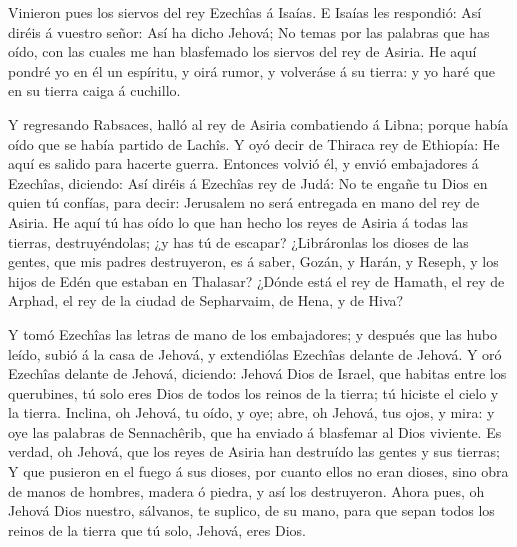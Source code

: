  Vinieron pues los siervos del rey Ezechîas á Isaías.
 E Isaías les respondió: Así diréis á vuestro señor: Así ha
dicho Jehová; No temas por las palabras que has oído, con las cuales me
han blasfemado los siervos del rey de Asiria.  He aquí
pondré yo en él un espíritu, y oirá rumor, y volveráse á su tierra: y yo
haré que en su tierra caiga á cuchillo.

 Y regresando Rabsaces, halló al rey de Asiria combatiendo á
Libna; porque había oído que se había partido de Lachîs.  Y
oyó decir de Thiraca rey de Ethiopía: He aquí es salido para hacerte
guerra. Entonces volvió él, y envió embajadores á Ezechîas, diciendo:
 Así diréis á Ezechîas rey de Judá: No te engañe tu Dios en
quien tú confías, para decir: Jerusalem no será entregada en mano del
rey de Asiria.  He aquí tú has oído lo que han hecho los
reyes de Asiria á todas las tierras, destruyéndolas; ¿y has tú de
escapar?  ¿Libráronlas los dioses de las gentes, que mis
padres destruyeron, es á saber, Gozán, y Harán, y Reseph, y los hijos de
Edén que estaban en Thalasar?  ¿Dónde está el rey de
Hamath, el rey de Arphad, el rey de la ciudad de Sepharvaim, de Hena, y
de Hiva?

 Y tomó Ezechîas las letras de mano de los embajadores; y
después que las hubo leído, subió á la casa de Jehová, y extendiólas
Ezechîas delante de Jehová.  Y oró Ezechîas delante de
Jehová, diciendo: Jehová Dios de Israel, que habitas entre los
querubines, tú solo eres Dios de todos los reinos de la tierra; tú
hiciste el cielo y la tierra.  Inclina, oh Jehová, tu oído,
y oye; abre, oh Jehová, tus ojos, y mira: y oye las palabras de
Sennachêrib, que ha enviado á blasfemar al Dios viviente. 
Es verdad, oh Jehová, que los reyes de Asiria han destruído las gentes y
sus tierras;  Y que pusieron en el fuego á sus dioses, por
cuanto ellos no eran dioses, sino obra de manos de hombres, madera ó
piedra, y así los destruyeron.  Ahora pues, oh Jehová Dios
nuestro, sálvanos, te suplico, de su mano, para que sepan todos los
reinos de la tierra que tú solo, Jehová, eres Dios.

